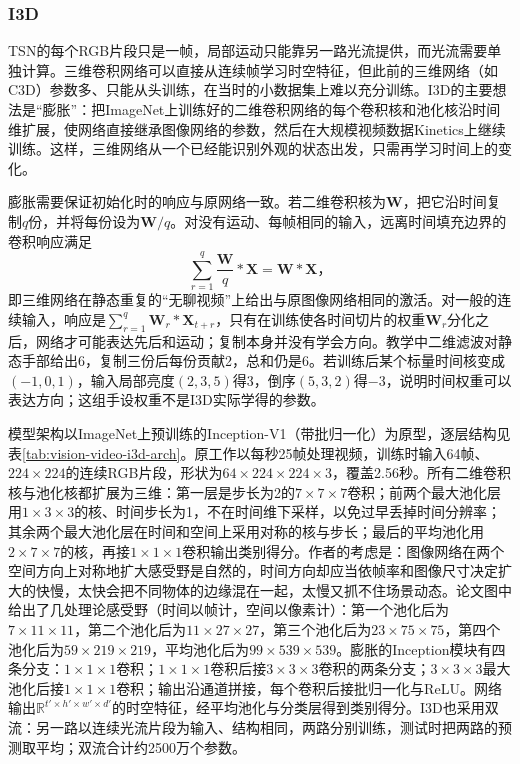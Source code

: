 \subsubsection{I3D}
\label{sec:vision-video-i3d}

TSN的每个RGB片段只是一帧，局部运动只能靠另一路光流提供，而光流需要单独计算。三维卷积网络可以直接从连续帧学习时空特征，但此前的三维网络（如C3D）参数多、只能从头训练，在当时的小数据集上难以充分训练。I3D的主要想法是“膨胀”：把ImageNet上训练好的二维卷积网络的每个卷积核和池化核沿时间维扩展，使网络直接继承图像网络的参数，然后在大规模视频数据Kinetics上继续训练。这样，三维网络从一个已经能识别外观的状态出发，只需再学习时间上的变化。

膨胀需要保证初始化时的响应与原网络一致。若二维卷积核为$\bm{W}$，把它沿时间复制$q$份，并将每份设为$\bm{W}/q$。对没有运动、每帧相同的输入，远离时间填充边界的卷积响应满足
\begin{equation}
  \sum_{r=1}^{q}\frac{\bm{W}}{q}*\bm{X}
  =\bm{W}*\bm{X}\text{，}
  \label{eq:vision-video-inflation}
\end{equation}
即三维网络在静态重复的“无聊视频”上给出与原图像网络相同的激活。对一般的连续输入，响应是$\sum_{r=1}^{q}\bm{W}_r*\bm{X}_{t+r}$，只有在训练使各时间切片的权重$\bm{W}_r$分化之后，网络才可能表达先后和运动；复制本身并没有学会方向。教学中二维滤波对静态手部给出6，复制三份后每份贡献2，总和仍是6。若训练后某个标量时间核变成$(-1,0,1)$，输入局部亮度$(2,3,5)$得3，倒序$(5,3,2)$得$-3$，说明时间权重可以表达方向；这组手设权重不是I3D实际学得的参数。

模型架构以ImageNet上预训练的Inception-V1（带批归一化）为原型，逐层结构见表\ref{tab:vision-video-i3d-arch}。原工作以每秒25帧处理视频，训练时输入64帧、$224\times224$的连续RGB片段，形状为$64\times224\times224\times3$，覆盖2.56秒。所有二维卷积核与池化核都扩展为三维：第一层是步长为2的$7\times7\times7$卷积；前两个最大池化层用$1\times3\times3$的核、时间步长为1，不在时间维下采样，以免过早丢掉时间分辨率；其余两个最大池化层在时间和空间上采用对称的核与步长；最后的平均池化用$2\times7\times7$的核，再接$1\times1\times1$卷积输出类别得分。作者的考虑是：图像网络在两个空间方向上对称地扩大感受野是自然的，时间方向却应当依帧率和图像尺寸决定扩大的快慢，太快会把不同物体的边缘混在一起，太慢又抓不住场景动态。论文图中给出了几处理论感受野（时间以帧计，空间以像素计）：第一个池化后为$7\times11\times11$，第二个池化后为$11\times27\times27$，第三个池化后为$23\times75\times75$，第四个池化后为$59\times219\times219$，平均池化后为$99\times539\times539$。膨胀的Inception模块有四条分支：$1\times1\times1$卷积；$1\times1\times1$卷积后接$3\times3\times3$卷积的两条分支；$3\times3\times3$最大池化后接$1\times1\times1$卷积；输出沿通道拼接，每个卷积后接批归一化与ReLU。网络输出$\mathbb{R}^{t'\times h'\times w'\times d'}$的时空特征，经平均池化与分类层得到类别得分。I3D也采用双流：另一路以连续光流片段为输入、结构相同，两路分别训练，测试时把两路的预测取平均；双流合计约2500万个参数。

